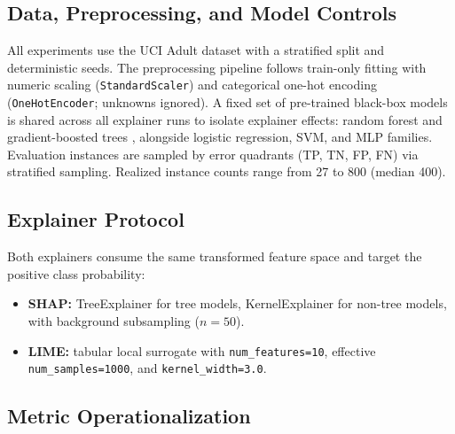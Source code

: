\documentclass[10pt]{article}
\begin{document}
\subsection{Data, Preprocessing, and Model Controls}
\label{sec:data}

All experiments use the UCI Adult dataset \citep{kohavi1996scaling} with
a stratified split and deterministic seeds. The preprocessing pipeline
follows train-only fitting with numeric scaling (\texttt{StandardScaler})
and categorical one-hot encoding (\texttt{OneHotEncoder};
unknowns ignored). A fixed set of pre-trained black-box models is shared across all
explainer runs to isolate explainer effects: random forest \citep{breiman2001random} and
gradient-boosted trees \citep{chen2016xgboost}, alongside logistic
regression, SVM, and MLP families. Evaluation instances are sampled by
error quadrants (TP, TN, FP, FN) via stratified sampling. Realized
instance counts range from 27 to 800 (median 400).

\subsection{Explainer Protocol}
\label{sec:explainer_protocol}

Both explainers consume the same transformed feature space and target the
positive class probability:
\begin{itemize}[leftmargin=*]
\item \textbf{SHAP:} TreeExplainer for tree models, KernelExplainer for
non-tree models, with background subsampling ($n=50$).
\item \textbf{LIME:} tabular local surrogate with
\texttt{num\_features=10}, effective \texttt{num\_samples=1000}, and
\texttt{kernel\_width=3.0}.
\end{itemize}

\subsection{Metric Operationalization}
\label{sec:metrics}
\end{document}
